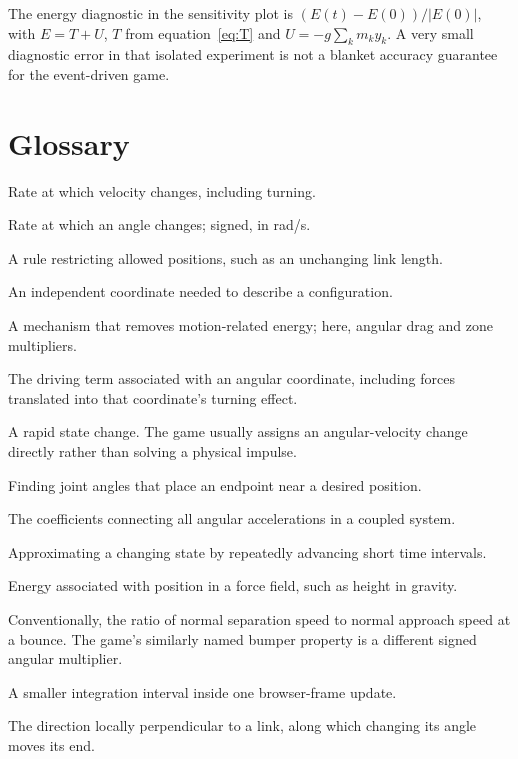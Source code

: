 \documentclass[11pt,a4paper]{article}
\begin{document}
The energy diagnostic in the sensitivity plot is \((E(t)-E(0))/|E(0)|\), with \(E=T+U\), \(T\) from equation~\eqref{eq:T} and \(U=-g\sum_k m_k y_k\). A very small diagnostic error in that isolated experiment is not a blanket accuracy guarantee for the event-driven game.

\section{Glossary}
\begin{description}[style=nextline]
\item[Acceleration] Rate at which velocity changes, including turning.
\item[Angular velocity] Rate at which an angle changes; signed, in rad/s.
\item[Constraint] A rule restricting allowed positions, such as an unchanging link length.
\item[Degree of freedom] An independent coordinate needed to describe a configuration.
\item[Damping] A mechanism that removes motion-related energy; here, angular drag and zone multipliers.
\item[Generalized torque] The driving term associated with an angular coordinate, including forces translated into that coordinate's turning effect.
\item[Impulse / kick] A rapid state change. The game usually assigns an angular-velocity change directly rather than solving a physical impulse.
\item[Inverse kinematics] Finding joint angles that place an endpoint near a desired position.
\item[Mass matrix] The coefficients connecting all angular accelerations in a coupled system.
\item[Numerical integration] Approximating a changing state by repeatedly advancing short time intervals.
\item[Potential energy] Energy associated with position in a force field, such as height in gravity.
\item[Restitution] Conventionally, the ratio of normal separation speed to normal approach speed at a bounce. The game's similarly named bumper property is a different signed angular multiplier.
\item[Substep] A smaller integration interval inside one browser-frame update.
\item[Tangent] The direction locally perpendicular to a link, along which changing its angle moves its end.
\end{description}
\end{document}

